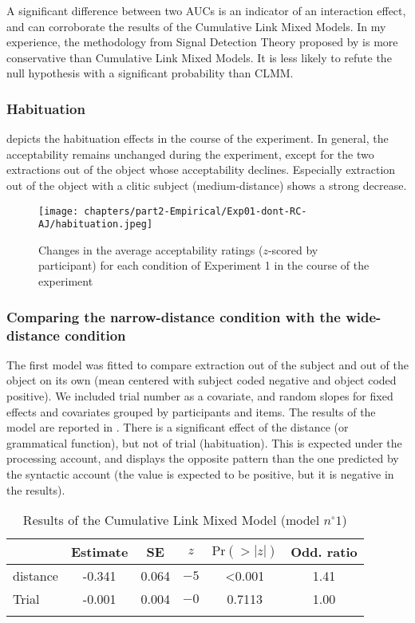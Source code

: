 A significant difference between two AUCs is an indicator of an interaction effect, and can corroborate the results of the Cumulative Link Mixed Models. In my experience, the methodology from  Signal Detection Theory proposed by \citet{Dillon.2019} is more conservative than Cumulative Link Mixed Models. It is less likely to refute the null hypothesis with a significant probability than CLMM.


\subsubsection{Habituation} 

 depicts the habituation effects in the course of the experiment. In general, the acceptability remains unchanged during the experiment, except for the two extractions out of the object whose acceptability declines. Especially extraction out of the object with a clitic subject (medium-distance) shows a strong decrease.

\begin{figure}
    \centering
    \texttt{[image: chapters/part2-Empirical/Exp01-dont-RC-AJ/habituation.jpeg]}
    \caption{Changes in the average acceptability ratings ($z$-scored by participant) for each condition of Experiment 1 in the course of the experiment}
    \label{fig:exp01-habituation}
\end{figure}

\subsubsection{Comparing the narrow-distance condition with the wide-distance condition}\largerpage[2]

The first model was fitted to compare extraction out of the subject and out of the object on its own (mean centered with subject coded negative and object coded positive). We included trial number as a covariate, and random slopes for fixed effects and covariates grouped by participants and items. The results of the model are reported in . 
There is a significant effect of the distance (or grammatical function), but not of trial (habituation). This is expected under the processing account, and displays the opposite pattern than the one predicted by the syntactic account (the value is expected to be positive, but it is negative in the results). 

\begin{table}
\centering
\begin{tabular}{l S[table-format=-1.3] S[table-format=1.3] c S[table-format=<1.4] S[table-format=1.2] }
\lsptoprule
 & {Estimate} & {SE} & {$z$} & {$\text{Pr}(>|z|)$} & {Odd. ratio} \\ 
\midrule
  distance & -0.341 & 0.064 & $-5$ & <0.001 & 1.41 \\ 
  Trial    & -0.001 & 0.004 & $-0$ & 0.7113 & 1.00 \\ 
 \lspbottomrule
\end{tabular}
\caption{Results of the Cumulative Link Mixed Model (model $n^{\circ}1$)}\label{tab:exp1-m1}
\end{table}

